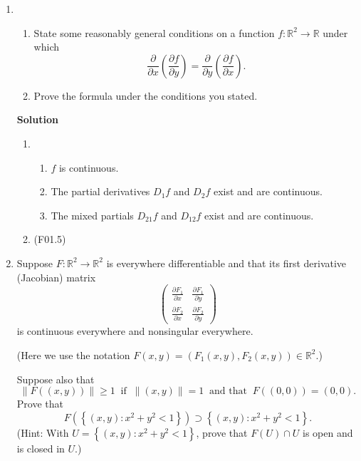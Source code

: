 \documentclass{article}
\newcommand{\matrixiibyii}[4]{\left( \begin{array}{cc} #1 & #2 \\ #3 & #4 \end{array} \right)}
\begin{document}
\begin{enumerate}
\begin{enumerate}
\end{enumerate}



\item 

\begin{enumerate}
\item State some reasonably general conditions on a function \(f : \mathbb{R}^2 \to \mathbb{R}\) under which
\[  \frac{\partial}{\partial x} \left( \frac{\partial f}{\partial y} \right)
  = \frac{\partial}{\partial y} \left( \frac{\partial f}{\partial x} \right).\]

\item Prove the formula under the conditions you stated.

\end{enumerate}

{\bf Solution}

\begin{enumerate}
\item
\begin{enumerate}
\item \(f\) is continuous.
\item The partial derivatives \(D_1f\) and \(D_2f\) exist and are continuous.
\item The mixed partials \(D_{21}f\) and \(D_{12}f\) exist and are continuous.
\end{enumerate}

\item (F01.5)

\end{enumerate}



\item Suppose \(F : \mathbb{R}^2 \to \mathbb{R}^2\) is everywhere differentiable and that its first derivative (Jacobian) matrix
\[\matrixiibyii{\frac{\partial F_1}{\partial x}}
               {\frac{\partial F_1}{\partial y}}
               {\frac{\partial F_2}{\partial x}}
               {\frac{\partial F_2}{\partial y}}\]
is continuous everywhere and nonsingular everywhere.

(Here we use the notation \(F(x,y) = (F_1(x,y), F_2(x,y)) \in \mathbb{R}^2\).)

Suppose also that
\[\|F((x,y))\| \geq 1 \ \text{ if } \ \|(x,y)\| = 1 \ \text{ and that } \ F((0,0)) = (0,0).\]
Prove that
\[F \left( \left\{ (x,y) : x^2 + y^2 < 1 \right\} \right) \supset \left\{ (x,y) : x^2 + y^2 < 1 \right\}.\]
(Hint:  With \(U = \left\{ (x,y) : x^2 + y^2 < 1 \right\}\), prove that \(F(U) \cap U\) is open and is closed in \(U\).)


\end{enumerate}
\end{document}

